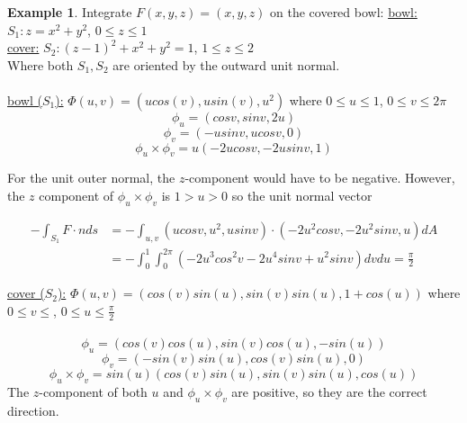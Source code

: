 \documentclass[12pt]{article}
\theoremstyle{plain}
\theoremstyle{definition}
\newtheorem{example}[theorem]{Example}
\begin{document}
\begin{example}
	Integrate $F(x,y,z) = (x,y,z)$ on the covered bowl:
	\underline{bowl:} $S_1 : z = x^2 + y^2$, $0 \leq z \leq 1$\\
	\underline{cover:} $S_2 : (z-1)^2 + x^2 + y^2 =1$, $1 \leq z \leq 2$\\
	Where both $S_1, S_2$ are oriented by the outward unit normal.\\
	\\
	\underline{bowl ($S_1$):} $\Phi (u,v) = (ucos(v), usin(v), u^2)$ where $0 \leq u \leq 1$, $0 \leq v \leq 2 \pi$
	$$\phi_u = (cosv, sinv, 2u)$$
	$$\phi_v = (-usinv, ucosv, 0)$$
	$$\phi_u \times \phi_v = u(-2ucosv, -2usinv, 1)$$
	
	For the unit outer normal, the $z$-component would have to be negative. However, the $z$ component of $\phi_u \times \phi_v$ is $1 > u > 0$ so the unit normal vector
	
	\begin{align*}
		-\int_{S_1} F \cdot n ds &= - \int_{u,v} (ucosv, u^2, usinv) \cdot (-2u^2 cosv, -2u^2 sinv, u) dA\\
		&= -\int_0^1 \int_0^{2\pi} (-2u^3cos^2 v - 2u^4 sinv + u^2 sinv) dv du = \frac{\pi}{2}
	\end{align*}
	
	\underline{cover ($S_2$):} $\Phi (u,v) = (cos(v)sin(u), sin(v)sin(u), 1+cos(u))$ where $0\leq v \leq$, $0 \leq u \leq \frac{\pi}{2}$\\
	\\
	$$\phi_u = (cos(v)cos(u),sin(v)cos(u), -sin(u))$$
	$$\phi_v = (-sin(v)sin(u), cos(v)sin(u), 0)$$
	$$\phi_u \times \phi_v =sin(u)(cos(v)sin(u), sin(v)sin(u), cos(u))$$
	The $z$-component of both $u$ and $\phi_u \times \phi_v$ are positive, so they are the correct direction.

\end{example}
\end{document}
